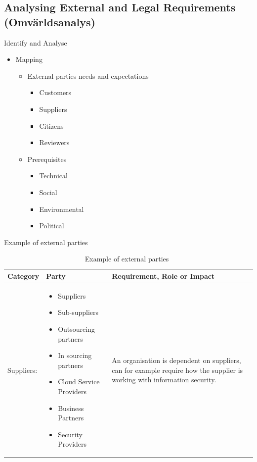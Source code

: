 \documentclass{beamer}
\begin{document}
\subsection{Analysing External and Legal Requirements (Omvärldsanalys)}
\begin{frame}{Identify and Analyse}
  \begin{itemize}
    \item Mapping 
      \begin{itemize}
        \item External parties needs and expectations
          \begin{itemize}
            \item Customers
            \item Suppliers
            \item Citizens
            \item Reviewers
          \end{itemize}
        \item Prerequisites
          \begin{itemize}
            \item Technical
            \item Social
            \item Environmental
            \item Political
          \end{itemize}
      \end{itemize}
  \end{itemize}
\end{frame}
\begin{frame}{Example of external parties}
  \begin{table}
    \small
    \caption{Example of external parties~\cite{msb_metodstod}}
    \begin{tabularx}{\textwidth}{X X X}
      Category & Party & Requirement, Role or Impact\\
      \toprule
      Suppliers: &
      \begin{itemize}
        \item Suppliers
        \item Sub-suppliers
        \item Outsourcing partners
        \item In sourcing partners
        \item Cloud Service Providers
        \item Business Partners
        \item Security Providers
      \end{itemize} &
      An organisation is dependent on suppliers, can for example require \newline
      how the supplier is working with information security.\\
    \end{tabularx}
  \end{table}
\end{frame}
\end{document}
